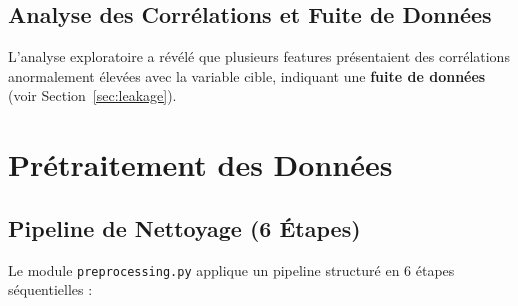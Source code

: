 \documentclass[12pt,a4paper]{article}
\begin{document}
\subsection{Analyse des Corrélations et Fuite de Données}

L'analyse exploratoire a révélé que plusieurs features présentaient des corrélations anormalement
élevées avec la variable cible, indiquant une \textbf{fuite de données} (voir Section~\ref{sec:leakage}).

\section{Prétraitement des Données}

\subsection{Pipeline de Nettoyage (6 Étapes)}

Le module \texttt{preprocessing.py} applique un pipeline structuré en 6 étapes séquentielles :
\end{document}

